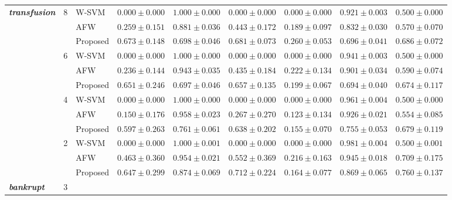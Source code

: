 \documentclass[pdflatex,sn-mathphys-num]{sn-jnl}%
\theoremstyle{thmstyleone}%
\theoremstyle{thmstyletwo}
\theoremstyle{thmstylethree}
\begin{document}
\begin{table}[htbp]
{\begin{tabular}{lllcccccc}
\midrule
\multirow{12}{*}{\textbf{\textit{transfusion}}} 
& \multirow{3}{*}{8}
& W-SVM     & $0.000 \pm 0.000$ & $\mathbf{1.000 \pm 0.000}$ & $0.000 \pm 0.000$ & $0.000 \pm 0.000$ & $\mathbf{0.921 \pm 0.003}$ & $0.500 \pm 0.000$ \\
& & AFW     & $0.259 \pm 0.151$ & $0.881 \pm 0.036$ & $0.443 \pm 0.172$ & $0.189 \pm 0.097$ & $0.832 \pm 0.030$ & $0.570 \pm 0.070$ \\
& & Proposed& $\mathbf{0.673 \pm 0.148}$ & $0.698 \pm 0.046$ & $\mathbf{0.681 \pm 0.073}$ & $\mathbf{0.260 \pm 0.053}$ & $0.696 \pm 0.041$ & $\mathbf{0.686 \pm 0.072}$ \\
\cmidrule{2-9}
& \multirow{3}{*}{6}
& W-SVM     & $0.000 \pm 0.000$ & $\mathbf{1.000 \pm 0.000}$ & $0.000 \pm 0.000$ & $0.000 \pm 0.000$ & $\mathbf{0.941 \pm 0.003}$ & $0.500 \pm 0.000$ \\
& & AFW     & $0.236 \pm 0.144$ & $0.943 \pm 0.035$ & $0.435 \pm 0.184$ & $\mathbf{0.222 \pm 0.134}$ & $0.901 \pm 0.034$ & $0.590 \pm 0.074$ \\
& & Proposed& $\mathbf{0.651 \pm 0.246}$ & $0.697 \pm 0.046$ & $\mathbf{0.657 \pm 0.135}$ & $0.199 \pm 0.067$ & $0.694 \pm 0.040$ & $\mathbf{0.674 \pm 0.117}$ \\
\cmidrule{2-9}
& \multirow{3}{*}{4}
& W-SVM     & $0.000 \pm 0.000$ & $\mathbf{1.000 \pm 0.000}$ & $0.000 \pm 0.000$ & $0.000 \pm 0.000$ & $\mathbf{0.961 \pm 0.004}$ & $0.500 \pm 0.000$ \\
& & AFW     & $0.150 \pm 0.176$ & $0.958 \pm 0.023$ & $0.267 \pm 0.270$ & $0.123 \pm 0.134$ & $0.926 \pm 0.021$ & $0.554 \pm 0.085$ \\
& & Proposed& $\mathbf{0.597 \pm 0.263}$ & $0.761 \pm 0.061$ & $\mathbf{0.638 \pm 0.202}$ & $\mathbf{0.155 \pm 0.070}$ & $0.755 \pm 0.053$ & $\mathbf{0.679 \pm 0.119}$ \\
\cmidrule{2-9}
& \multirow{3}{*}{2}
& W-SVM     & $0.000 \pm 0.000$ & $\mathbf{1.000 \pm 0.001}$ & $0.000 \pm 0.000$ & $0.000 \pm 0.000$ & $\mathbf{0.981 \pm 0.004}$ & $0.500 \pm 0.001$ \\
& & AFW     & $0.463 \pm 0.360$ & $0.954 \pm 0.021$ & $0.552 \pm 0.369$ & $\mathbf{0.216 \pm 0.163}$ & $0.945 \pm 0.018$ & $0.709 \pm 0.175$ \\
& & Proposed& $\mathbf{0.647 \pm 0.299}$ & $0.874 \pm 0.069$ & $\mathbf{0.712 \pm 0.224}$ & $0.164 \pm 0.077$ & $0.869 \pm 0.065$ & $\mathbf{0.760 \pm 0.137}$ \\
\midrule
\multirow{12}{*}{\textbf{\textit{bankrupt}}}
& \multirow{3}{*}{3}

\end{tabular}}
\end{table}
\end{document}
